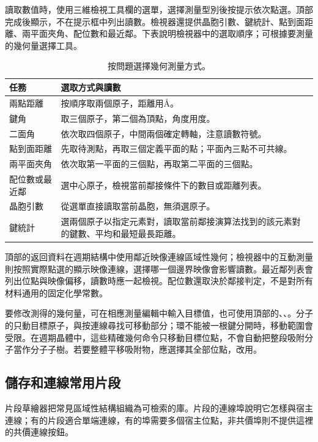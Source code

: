 讀取數值時，使用三維檢視工具欄的選單，選擇測量型別後按提示依次點選。頂部完成後顯示，不在提示框中列出讀數。檢視器還提供晶胞引數、鍵統計、點到面距離、兩平面夾角、配位數和最近鄰。下表說明檢視器中的選取順序；可根據要測量的幾何量選擇工具。

\begin{table}[htbp]
\centering\small
\begin{tabularx}{\linewidth}{lX}
\toprule
任務 & 選取方式與讀數 \\
\midrule
兩點距離 & 按順序取兩個原子，距離用\AA。 \\
鍵角 & 取三個原子，第二個為頂點，角度用度。 \\
二面角 & 依次取四個原子，中間兩個確定轉軸，注意讀數符號。 \\
點到面距離 & 先取待測點，再取三個定義平面的點；平面內三點不可共線。 \\
兩平面夾角 & 依次取第一平面的三個點，再取第二平面的三個點。 \\
配位數或最近鄰 & 選中心原子，檢視當前鄰接條件下的數目或距離列表。 \\
晶胞引數 & 從選單直接讀取當前晶胞，無須選原子。 \\
鍵統計 & 選兩個原子以指定元素對，讀取當前鄰接演算法找到的該元素對的鍵數、平均和最短最長距離。 \\
\bottomrule
\end{tabularx}
\caption{按問題選擇幾何測量方式。}
\end{table}

頂部的返回資料在週期結構中使用鄰近映像連線區域性幾何；檢視器中的互動測量則按照實際點選的顯示映像連線，選擇哪一個邊界映像會影響讀數。最近鄰列表會列出位點與映像偏移，讀數時應一起檢視。配位數還取決於鄰接判定，不是對所有材料通用的固定化學常數。

要修改測得的幾何量，可在相應測量編輯中輸入目標值，也可使用頂部的、、。分子的只動目標原子，與按連線尋找可移動部分；環不能被一根鍵分開時，移動範圍會受限。在週期晶體中，這些精確幾何命令只移動目標位點，不會自動把整段吸附分子當作分子子樹。若要整體平移吸附物，應選擇其全部位點，改用。

\subsection{儲存和連線常用片段}\label{sec:fragment-library-reference}

片段草繪器把常見區域性結構組織為可檢索的庫。片段的連線埠說明它怎樣與宿主連線；有的片段適合單端連線，有的埠需要多個宿主位點，非共價埠則不提供這裡的共價連線按鈕。

